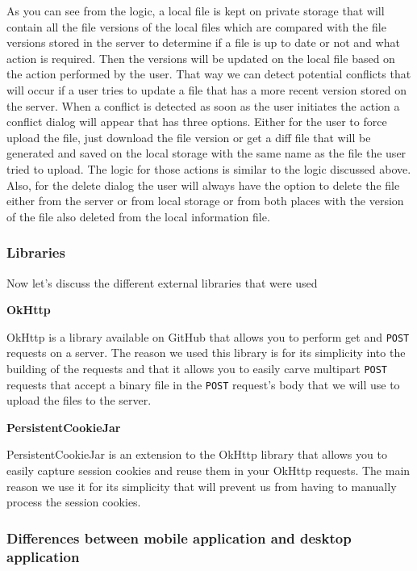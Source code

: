 \documentclass[11pt]{article}
\begin{document}
As you can see from the logic, a local file is kept on private storage that will contain all the file versions of the local files which are compared with the file versions stored in the server to determine if a file is up to date or not and what action is required. Then the versions will be updated on the local file based on the action performed by the user. That way we can detect potential conflicts that will occur if a user tries to update a file that has a more recent version stored on the server. When a conflict is detected as soon as the user initiates the action a conflict dialog will appear that has three options. Either for the user to force upload the file, just download the file version or get a diff file that will be generated and saved on the local storage with the same name as the file the user tried to upload. The logic for those actions is similar to the logic discussed above. Also, for the delete dialog the user will always have the option to delete the file either from the server or from local storage or from both places with the version of the file also deleted from the local information file.

\subsubsection*{Libraries}

Now let's discuss the different external libraries that were used

\textbf{OkHttp}

OkHttp \cite{okhttp:19} is a library available on GitHub that allows you to perform get and {\tt POST} requests on a server. The reason we used this library is for its simplicity into the building of the requests and that it allows you to easily carve multipart {\tt POST} requests that accept a binary file in the {\tt POST} request's body that we will use to upload the files to the server.

\textbf{PersistentCookieJar}

PersistentCookieJar \cite{persistentcookiejar:19} is an extension to the OkHttp library that allows you to easily capture session cookies and reuse them in your OkHttp requests. The main reason we use it for its simplicity that will prevent us from having to manually process the session cookies.

\subsubsection*{Differences between mobile application and desktop application}
\end{document}
